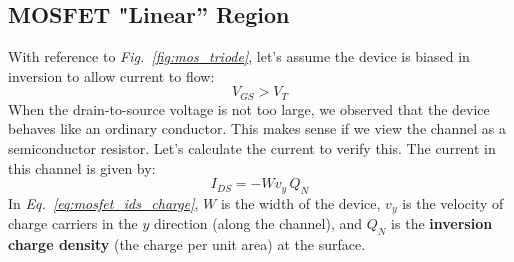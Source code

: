 \subsection{MOSFET "Linear'' Region}
With reference to \emph{Fig.~\ref{fig:mos_triode}}, let's assume the device is biased in inversion to allow current to flow:
    \begin{equation}
        V_{GS} > V_{T}
    \end{equation}
When the drain-to-source voltage is not too large, we observed that the device behaves like an ordinary conductor.  This makes sense if we view the channel as a semiconductor resistor.  Let's calculate the current to verify this.  The current in this channel is given by:
    \begin{equation}
        I_{DS} = -W v_y\,Q_N
        \label{eq:mosfet_ids_charge}
    \end{equation}
In \emph{Eq.~\ref{eq:mosfet_ids_charge}}, $W$ is the width of the device, $v_y$ is the velocity of charge carriers in the $y$ direction (along the channel), and $Q_N$ is the \textbf{inversion charge density} (the charge per unit area) at the surface.


